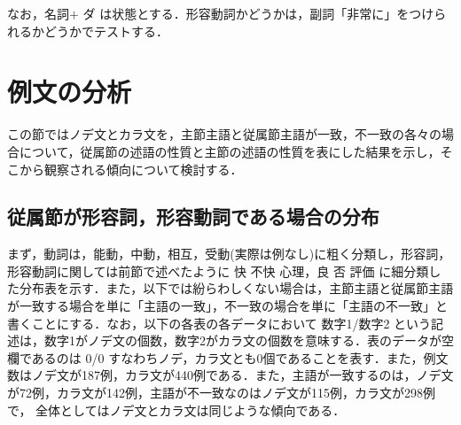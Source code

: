 なお，名詞\hspace{-0.3mm}$+$ \hspace*{-1mm}ダ は状態とする．形容動詞かどうかは，副詞「非常に」をつけら
れるかどうかでテストする．

\section{例文の分析}

この節ではノデ文とカラ文を，主節主語と従属節主語が一致，不一致の各々の場
合について，従属節の述語の性質と主節の述語の性質を表にした結果を示し，そ
こから観察される傾向について検討する．

\subsection{従属節が形容詞，形容動詞である場合の分布}

まず，動詞は，能動，中動，相互，受動(実際は例なし)に粗く分類し，形容詞，
形容動詞に関しては前節で述べたように 快 不快 心理，良 否 評価 に細分類し
た分布表を示す．また，以下では紛らわしくない場合は，主節主語と従属節主語
が一致する場合を単に「主語の一致」，不一致の場合を単に「主語の不一致」と
書くことにする．なお，以下の各表の各データにおいて 数字1/数字2 という記
述は，数字1がノデ文の個数，数字2がカラ文の個数を意味する．表のデータが空
欄であるのは 0/0 すなわちノデ，カラ文とも0個であることを表す．また，例文
数はノデ文が187例，カラ文が440例である．また，主語が一致するのは，ノデ文
が72例，カラ文が142例，主語が不一致なのはノデ文が115例，カラ文が298例で，
全体としてはノデ文とカラ文は同じような傾向である．

